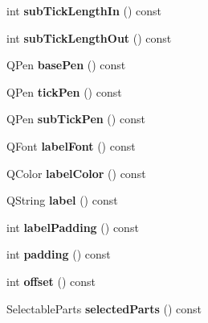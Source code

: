 \begin{DoxyCompactItemize}
\item 
\mbox{\label{class_q_c_p_axis_af907c8ecc4624d1bf4a8f6f702e64fbe}} 
int {\bfseries sub\+Tick\+Length\+In} () const
\item 
\mbox{\label{class_q_c_p_axis_ac98c66cae50c98f3ae90e2969382976d}} 
int {\bfseries sub\+Tick\+Length\+Out} () const
\item 
\mbox{\label{class_q_c_p_axis_a216974be018e73008b3cf6d033c1325d}} 
Q\+Pen {\bfseries base\+Pen} () const
\item 
\mbox{\label{class_q_c_p_axis_affd022d4f56dfc575b4ced95ad417860}} 
Q\+Pen {\bfseries tick\+Pen} () const
\item 
\mbox{\label{class_q_c_p_axis_a7a89df74ba427fac311bf4cc92fbddca}} 
Q\+Pen {\bfseries sub\+Tick\+Pen} () const
\item 
\mbox{\label{class_q_c_p_axis_aa7b465fe233f1878793954ba5ab9c47e}} 
Q\+Font {\bfseries label\+Font} () const
\item 
\mbox{\label{class_q_c_p_axis_a05794f13d322da7fd9d5554d11186b0e}} 
Q\+Color {\bfseries label\+Color} () const
\item 
\mbox{\label{class_q_c_p_axis_a32ba4d3effcddd8af3bc49f405e1d53e}} 
Q\+String {\bfseries label} () const
\item 
\mbox{\label{class_q_c_p_axis_a6d9a9fe1c7166f209fb1e25686390451}} 
int {\bfseries label\+Padding} () const
\item 
\mbox{\label{class_q_c_p_axis_a07df379d5c017b8f3a4702532eb037b2}} 
int {\bfseries padding} () const
\item 
\mbox{\label{class_q_c_p_axis_aef66fa16353b4993b1cceabfb644a1a9}} 
int {\bfseries offset} () const
\item 
\mbox{\label{class_q_c_p_axis_a893e8d6cfed9267eb2b793cb1d2b4dce}} 
Selectable\+Parts {\bfseries selected\+Parts} () const

\end{DoxyCompactItemize}
